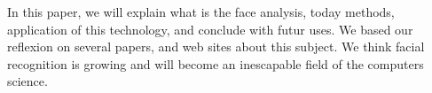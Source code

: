 In this paper, we will explain what is the face analysis, today methods, application of this technology, and conclude with futur uses. We based our reflexion on several papers, and web sites about this subject. We think facial recognition is growing and will become an inescapable field of the computers science.
